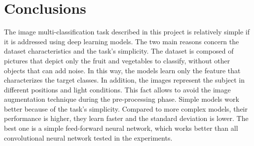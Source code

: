 \section{Conclusions}\label{header-n631}

The image multi-classification task described in this project is
relatively simple if it is addressed using deep learning models. The two
main reasons concern the dataset characteristics and the task's
simplicity. The dataset is composed of pictures that depict only the
fruit and vegetables to classify, without other objects that can add
noise. In this way, the models learn only the feature that characterizes
the target classes. In addition, the images represent the subject in
different positions and light conditions. This fact allows to avoid the
image augmentation technique during the pre-processing phase. Simple
models work better because of the task's simplicity. Compared to more
complex models, their performance is higher, they learn faster and the
standard deviation is lower. The best one is a simple feed-forward
neural network, which works better than all convolutional neural network
tested in the experiments.


